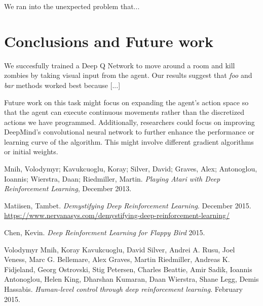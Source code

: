 \documentclass{article}
\begin{document}
\begin{multicols}{2}
We ran into the unexpected problem that...





\section{Conclusions and Future work}
We succesfully trained a Deep Q Network to move around a room and kill zombies by taking visual input from the agent.
Our results suggest that \emph{foo} and \emph{bar} methods worked best because [...]

Future work on this task might focus on expanding the agent's action space so that the agent can execute continuous movements rather than the discretized actions we have programmed.
Additionally, researchers could focus on improving DeepMind's convolutional neural network to further enhance the performance or learning curve of the algorithm.
This might involve different gradient algorithms or initial weights.

\end{multicols}



\pagebreak
\begin{thebibliography}{9}

Mnih, Volodymyr; Kavukcuoglu, Koray; Silver, David; Graves, Alex; Antonoglou, Ioannis; Wierstra, Daan; Riedmiller, Martin.
\emph{Playing Atari with Deep Reinforcement Learning},
December 2013.

Matiisen, Tambet.
\emph{Demystifying Deep Reinforcement Learning}. December 2015.
\url{https://www.nervanasys.com/demystifying-deep-reinforcement-learning/}

Chen, Kevin.
\emph{Deep Reinforcment Learning for Flappy Bird}
2015.

Volodymyr Mnih,	Koray Kavukcuoglu,	David Silver, Andrei A. Rusu, Joel Veness, Marc G. Bellemare, Alex Graves,	Martin Riedmiller, Andreas K. Fidjeland, Georg Ostrovski, Stig Petersen, Charles Beattie, Amir Sadik, Ioannis Antonoglou,	Helen King,	Dharshan Kumaran, Daan Wierstra, Shane Legg, Demis Hassabis.
\emph{Human-level control through deep reinforcement learning}.
February 2015.

\end{thebibliography}
\end{document}

